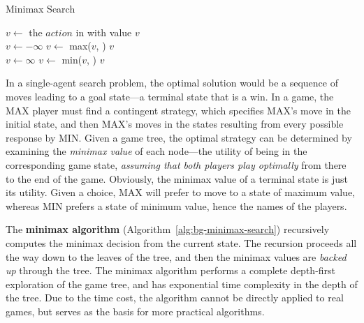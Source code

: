 \begin{algorithm}
\caption{Minimax Search}
\label{alg:bg-minimax-search}
\begin{algorithmic}[1]
   \State $v \leftarrow$ 
   \State \Return the $action$ in  with value $v$
\EndProcedure
\\
   \label{alg:bg-minimax-terminal-max}
     \State \Return {}
  \EndIf
  \State $v \leftarrow -\infty$ 
     \State $v \leftarrow$ max($v$, )
  \EndFor
  \State \Return $v$
\EndProcedure
\\
   \label{alg:bg-minimax-terminal-min}
     \State \Return {}
  \EndIf
  \State $v \leftarrow \infty$ 
     \State $v \leftarrow$ min($v$, )
  \EndFor
  \State \Return $v$
\EndProcedure
\end{algorithmic}
\end{algorithm}

In a single-agent search problem, the optimal solution would be a
sequence of moves leading to a goal state---a terminal state that is a
win. In a game, the MAX player must find a contingent strategy, which
specifies MAX's move in the initial state, and then MAX's moves in the
states resulting from every possible response by MIN. Given a game
tree, the optimal strategy can be determined by examining the {\em
  minimax value} of each node---the utility of being in the
corresponding game state, {\em assuming that both players play
  optimally} from there to the end of the game. Obviously, the minimax
value of  a terminal state is just its utility. Given a choice, MAX
will prefer to move to a state of maximum value, whereas MIN prefers a
state of minimum value, hence the names of the players. 

The {\bf minimax algorithm} (Algorithm~\ref{alg:bg-minimax-search}) 
recursively computes the minimax decision from the
current state. The recursion proceeds all the way down to the leaves
of the tree, and then the minimax values are {\em backed up} through
the tree.  The minimax algorithm performs a complete depth-first
exploration of the game tree, and has exponential time complexity in
the depth of the tree. Due to the time cost, the algorithm cannot be
directly applied to real games, but serves as the basis for more
practical algorithms. 

